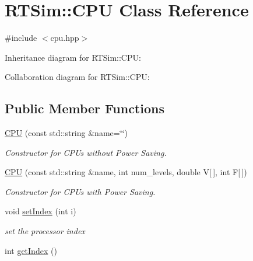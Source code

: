 \hypertarget{classRTSim_1_1CPU}{}\section{R\+T\+Sim\+:\+:C\+PU Class Reference}
\label{classRTSim_1_1CPU}


{\ttfamily \#include $<$cpu.\+hpp$>$}



Inheritance diagram for R\+T\+Sim\+:\+:C\+PU\+:


Collaboration diagram for R\+T\+Sim\+:\+:C\+PU\+:
\subsection*{Public Member Functions}
\begin{DoxyCompactItemize}
\item 
\hyperlink{classRTSim_1_1CPU_a92d183b898955f63b9ceb0c0c6c85beb}{C\+PU} (const std\+::string \&name=\char`\"{}\char`\"{})\hypertarget{classRTSim_1_1CPU_a92d183b898955f63b9ceb0c0c6c85beb}{}\label{classRTSim_1_1CPU_a92d183b898955f63b9ceb0c0c6c85beb}

\begin{DoxyCompactList}\small\item\em Constructor for C\+P\+Us without Power Saving. \end{DoxyCompactList}\item 
\hyperlink{classRTSim_1_1CPU_a53cbb6072b04baba7ed9a206d5425a1c}{C\+PU} (const std\+::string \&name, int num\+\_\+levels, double V\mbox{[}$\,$\mbox{]}, int F\mbox{[}$\,$\mbox{]})\hypertarget{classRTSim_1_1CPU_a53cbb6072b04baba7ed9a206d5425a1c}{}\label{classRTSim_1_1CPU_a53cbb6072b04baba7ed9a206d5425a1c}

\begin{DoxyCompactList}\small\item\em Constructor for C\+P\+Us with Power Saving. \end{DoxyCompactList}\item 
void \hyperlink{classRTSim_1_1CPU_a7e3c4b8bb962daffaf6f7353934d8368}{set\+Index} (int i)\hypertarget{classRTSim_1_1CPU_a7e3c4b8bb962daffaf6f7353934d8368}{}\label{classRTSim_1_1CPU_a7e3c4b8bb962daffaf6f7353934d8368}

\begin{DoxyCompactList}\small\item\em set the processor index \end{DoxyCompactList}\item 
int \hyperlink{classRTSim_1_1CPU_a46e14214e7120dca5878933175d0d7d4}{get\+Index} ()\hypertarget{classRTSim_1_1CPU_a46e14214e7120dca5878933175d0d7d4}{}\label{classRTSim_1_1CPU_a46e14214e7120dca5878933175d0d7d4}


\end{DoxyCompactItemize}
